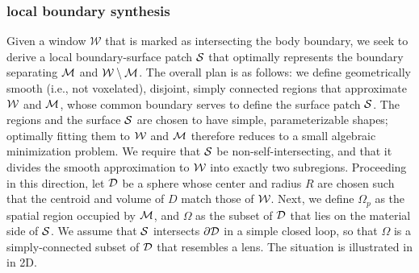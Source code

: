 \subsubsection{local boundary synthesis}

Given a window $\mathcal{W}$ that is marked as intersecting the body boundary, we seek to derive a local boundary-surface patch $\mathcal{S}$ that optimally represents the boundary separating $\mathcal{M}$ and $\mathcal{W} \setminus \mathcal{M}$.  The overall plan is as follows: we define geometrically smooth (i.e., not voxelated), disjoint, simply connected regions that approximate $\mathcal{W}$ and $\mathcal{M}$, whose common boundary serves to define the surface patch $\mathcal{S}$.  The regions and the surface $\mathcal{S}$ are chosen to have simple, parameterizable shapes; optimally fitting them to $\mathcal{W}$ and $\mathcal{M}$ therefore reduces to a small algebraic minimization problem.  We require that $\mathcal{S}$ be non-self-intersecting, and that it divides the smooth approximation to $\mathcal{W}$ into exactly two subregions. 
Proceeding in this direction, let $\mathcal{D}$ be a sphere whose center and radius $R$ are chosen such that the centroid and volume of $D$ match those of $\mathcal{W}$.  Next, we define $\Omega_p$ as the spatial region occupied by $\mathcal{M}$, and $\Omega$ as the subset of $\mathcal{D}$ that lies on the material side of $\mathcal{S}$.  We assume that $\mathcal{S}$ intersects $\partial \mathcal{D}$ in a simple closed loop, so that $\Omega$ is a simply-connected subset of $\mathcal{D}$ that resembles a lens. The situation is illustrated in  in 2D.

